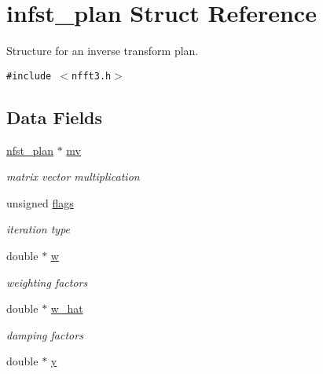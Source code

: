\hypertarget{structinfst__plan}{
\section{infst\_\-plan Struct Reference}
\label{structinfst__plan}
}
Structure for an inverse transform plan.  


{\tt \#include $<$nfft3.h$>$}

\subsection*{Data Fields}
\begin{CompactItemize}
\item 
\hypertarget{structinfst__plan_o0}{
\hyperlink{structnfst__plan}{nfst\_\-plan} $\ast$ \hyperlink{structinfst__plan_o0}{mv}}
\label{structinfst__plan_o0}

\begin{CompactList}\small\item\em matrix vector multiplication \item\end{CompactList}\item 
\hypertarget{structinfst__plan_o1}{
unsigned \hyperlink{structinfst__plan_o1}{flags}}
\label{structinfst__plan_o1}

\begin{CompactList}\small\item\em iteration type \item\end{CompactList}\item 
\hypertarget{structinfst__plan_o2}{
double $\ast$ \hyperlink{structinfst__plan_o2}{w}}
\label{structinfst__plan_o2}

\begin{CompactList}\small\item\em weighting factors \item\end{CompactList}\item 
\hypertarget{structinfst__plan_o3}{
double $\ast$ \hyperlink{structinfst__plan_o3}{w\_\-hat}}
\label{structinfst__plan_o3}

\begin{CompactList}\small\item\em damping factors \item\end{CompactList}\item 
\hypertarget{structinfst__plan_o4}{
double $\ast$ \hyperlink{structinfst__plan_o4}{y}}
\label{structinfst__plan_o4}


\end{CompactItemize}
